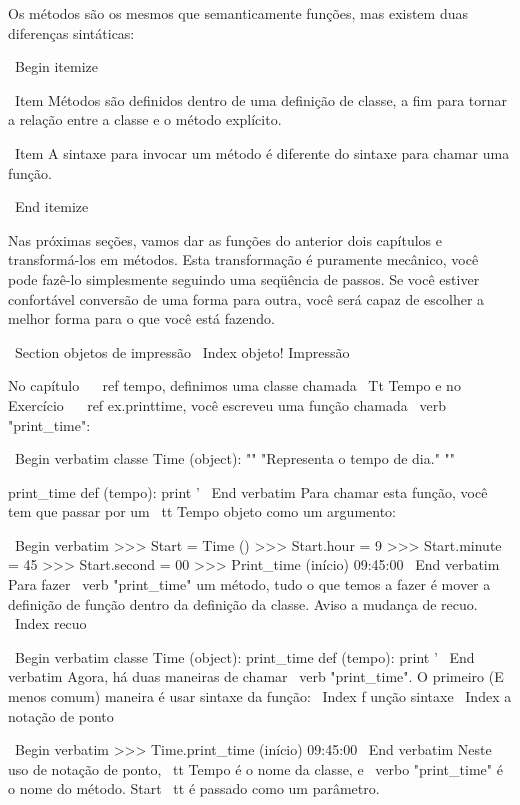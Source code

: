 \documentclass[10pt]{book}
\begin{document}
{{{{{{{{{{{{{{Os métodos são os mesmos que semanticamente funções, mas existem
duas diferenças sintáticas:

\ Begin {itemize}

\ Item Métodos são definidos dentro de uma definição de classe, a fim
para tornar a relação entre a classe e o método explícito.

\ Item A sintaxe para invocar um método é diferente do
sintaxe para chamar uma função.

\ End {itemize}

Nas próximas seções, vamos dar as funções do anterior
dois capítulos e transformá-los em métodos. Esta transformação é
puramente mecânico, você pode fazê-lo simplesmente seguindo uma seqüência de
passos. Se você estiver confortável conversão de uma forma para outra,
você será capaz de escolher a melhor forma para o que você está fazendo.


\ Section {} objetos de impressão
\ Index {objeto! Impressão}

No capítulo ~ \ ref {tempo}, definimos uma classe chamada
{\ Tt} Tempo e no Exercício ~ \ ref {} ex.printtime, você 
escreveu uma função chamada \ verb "print_time":

\ Begin {verbatim}
classe Time (object):
    "" "Representa o tempo de dia." ""

print_time def (tempo):
    print '%
\ End {verbatim}
%
Para chamar esta função, você tem que passar por um {\ tt Tempo} objeto como um
argumento:

\ Begin {verbatim}
>>> Start = Time ()
>>> Start.hour = 9
>>> Start.minute = 45
>>> Start.second = 00
>>> Print_time (início)
09:45:00
\ End {verbatim}
%
Para fazer \ verb "print_time" um método, tudo o que temos a fazer é
mover a definição de função dentro da definição da classe. Aviso
a mudança de recuo.
\ Index {recuo}

\ Begin {verbatim}
classe Time (object):
    print_time def (tempo):
        print '%
\ End {verbatim}
%
Agora, há duas maneiras de chamar \ verb "print_time". O primeiro
(E menos comum) maneira é usar sintaxe da função:
\ Index {f unção sintaxe}
\ Index {} a notação de ponto


\ Begin {verbatim}
>>> Time.print_time (início)
09:45:00
\ End {verbatim}
%
Neste uso de notação de ponto, {\ tt Tempo} é o nome da classe,
e \ verbo "print_time" é o nome do método. {Start \ tt} é
passado como um parâmetro.

}}}}}}}}}}}}}}
\end{document}

